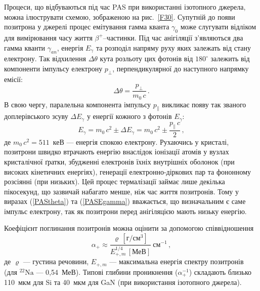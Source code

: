 Процеси, що відбуваються під час PAS при використанні ізотопного джерела, можна ілюструвати схемою,
зображеною на рис.~\ref{F30}.
Супутній до появи позитрона у джерелі процес емітування гамма кванта $\gamma_0$ може слугувати
відліком для вимірювання часу життя $\beta^+$--частинки.
Під час анігіляції з'являються два гамма кванти $\gamma_{an}$, енергія $E_\gamma$
та розподіл напряму руху яких залежать від стану електрону.
Так відхилення $\Delta\theta$ кута розльоту цих фотонів
від $180^\circ$ залежить від компоненти імпульсу електрону $p_\perp$, перпендикулярної до наступного
напрямку емісії:
\begin{equation}\label{PAStheta}
\Delta\theta=\frac{p_\perp}{m_0\,c}\,.
\end{equation}
В свою чергу, паралельна компонента імпульсу $p_\parallel$ викликає появу
так званого доплерівського зсуву $\Delta E_\gamma$ у енергії кожного з фотонів $E_\gamma$:
\begin{equation}\label{PASEgamma}
E_\gamma=m_0\,c^2\pm\Delta E_\gamma=m_0\,c^2\pm\frac{p_\parallel \,c}{2}\,,
\end{equation}
де
$m_0\,c^2=511$~кеВ --- енергія спокою електрону.
Рухаючись у кристалі,  позитрони швидко втрачають енергію внаслідок
іонізації атомів у вузлах кристалічної ґратки, збудженні електронів їхніх
внутрішніх оболонок (при високих кінетичних енергіях), генерації електронно-діркових пар та
фононному розсіянні (при низьких).
Цей процес термалізації займає лише декілька пікосекунд, що зазвичай набагато менше, ніж час життя позитронів.
Тому у виразах (\ref{PAStheta}) та (\ref{PASEgamma}) вважається, що визначальним
є саме імпульс електрону, так як позитрони перед анігіляцією мають низьку енергію.



Коефіцієнт поглинання позитронів можна оцінити за допомогою співвідношення \cite{PAS}
\begin{equation}
\alpha_+\approx\frac{\varrho\,\left[\text{г}/\text{см}^3\right]}{E_{+,m}^{1/4}\,[\text{МеВ}]}\:\text{см}^{-1}\,,
\end{equation}
де
$\varrho$ --- густина речовини,
$E_{+,m}$ --- максимальна енергія спектру позитронів (для $^{22}\text{Na}$ --- 0,54~МеВ).
Типові глибини проникнення ($\alpha^{-1}_+$) складають близько 110~мкм для Si та 40~мкм для GaN (при використання ізотопного джерела).

